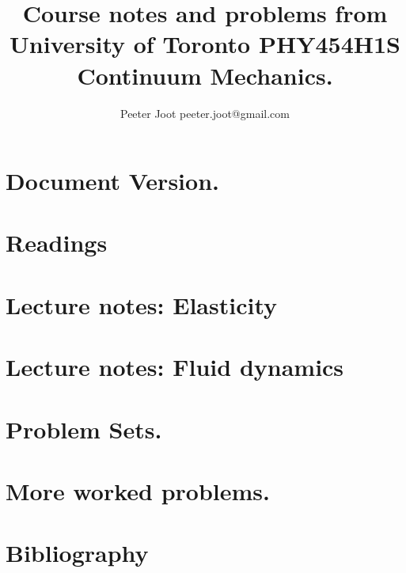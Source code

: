 \documentclass[12pt,leqno]{book}
\begin{document}

\title{Course notes and problems from\\University of Toronto PHY454H1S\\Continuum Mechanics.}
\author{Peeter Joot \quad peeter.joot@gmail.com}

\maketitle

\clearpage{}
\tableofcontents

\clearpage{}

\pagestyle{plain}



\part{Document Version.}


\part{Readings}


\part{Lecture notes: Elasticity}








\part{Lecture notes: Fluid dynamics}








\part{Problem Sets.}

\part{More worked problems.}



%
\part{Bibliography}




\end{document}
